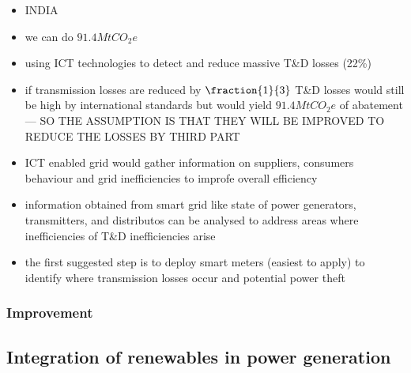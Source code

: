 \documentclass[11pt, twocolumn]{article}
\begin{document}
\begin{itemize}
\item INDIA
\item we can do $91.4 Mt CO_2e$
\item using ICT technologies to detect and reduce massive T\&D losses (22\%)
\item if transmission losses are reduced by $\fraction{1}{3}$ T\&D losses would still be high by international standards but would yield $91.4 MtCO_2e$ of abatement --- SO THE ASSUMPTION IS THAT THEY WILL BE IMPROVED TO REDUCE THE LOSSES BY THIRD PART
\item ICT enabled grid would gather information on suppliers, consumers behaviour and grid inefficiencies to improfe overall efficiency
\item information obtained from smart grid like state of power generators, transmitters, and distributos can be analysed to address areas where inefficiencies of T\&D inefficiencies arise
\item the first suggested step is to deploy smart meters (easiest to apply) to identify where transmission losses occur and potential power theft

\end{itemize}
\subsubsection{Improvement}

\subsection{Integration of renewables in power generation}
\end{document}
